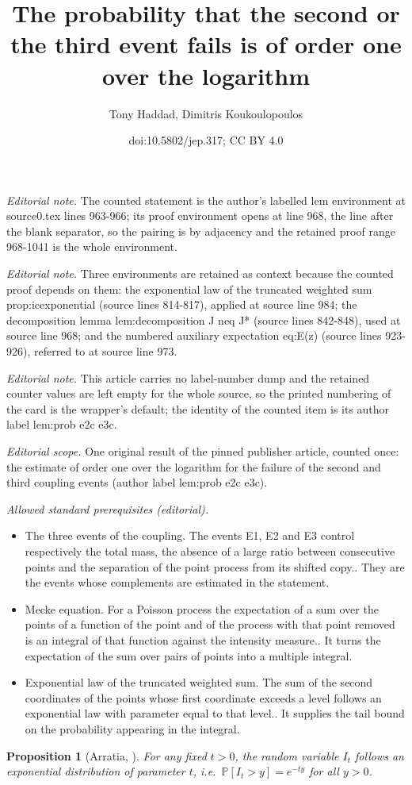 \documentclass[10pt,a4paper]{article}
\title{The probability that the second or the third event fails is of order one over the logarithm}
\author{Tony Haddad, Dimitris Koukoulopoulos}
\date{doi:10.5802/jep.317; CC BY 4.0}
\providecommand{\ie}{i.e.\ }
\newcommand{\PP}{\mathbb{P}}
\newcommand{\prob}[1]{\PP[ #1 ]}
\theoremstyle{plain}
\newtheorem{prop}[cor]{Proposition}
\theoremstyle{definition}
\begin{document}
\maketitle
\noindent\textit{Editorial note.} The counted statement is the author's labelled lem environment at source0.tex lines 963-966; its proof environment opens at line 968, the line after the blank separator, so the pairing is by adjacency and the retained proof range 968-1041 is the whole environment.\par\medskip
\noindent\textit{Editorial note.} Three environments are retained as context because the counted proof depends on them: the exponential law of the truncated weighted sum prop:icexponential (source lines 814-817), applied at source line 984; the decomposition lemma lem:decomposition J neq J* (source lines 842-848), used at source line 968; and the numbered auxiliary expectation eq:E(z) (source lines 923-926), referred to at source line 973.\par\medskip
\noindent\textit{Editorial note.} This article carries no label-number dump and the retained counter values are left empty for the whole source, so the printed numbering of the card is the wrapper's default; the identity of the counted item is its author label lem:prob e2c e3c.\par\medskip
\noindent\textit{Editorial scope.} One original result of the pinned publisher article, counted once: the estimate of order one over the logarithm for the failure of the second and third coupling events (author label lem:prob e2c e3c).\par\medskip
\noindent\textit{Allowed standard prerequisites (editorial).}\begin{itemize}
\item The three events of the coupling. The events E1, E2 and E3 control respectively the total mass, the absence of a large ratio between consecutive points and the separation of the point process from its shifted copy.. They are the events whose complements are estimated in the statement.
\item Mecke equation. For a Poisson process the expectation of a sum over the points of a function of the point and of the process with that point removed is an integral of that function against the intensity measure.. It turns the expectation of the sum over pairs of points into a multiple integral.
\item Exponential law of the truncated weighted sum. The sum of the second coordinates of the points whose first coordinate exceeds a level follows an exponential law with parameter equal to that level.. It supplies the tail bound on the probability appearing in the integral.
\end{itemize}\medskip
\begin{prop}[Arratia, \cite{Arratia02}]
\label{prop:icexponential}
For any fixed $t > 0$, the random variable $I_t$ follows an exponential distribution of parameter $t$, \ie $\prob{I_t > y} = e^{-ty}$ for all $y > 0$.
\end{prop}
\end{document}
